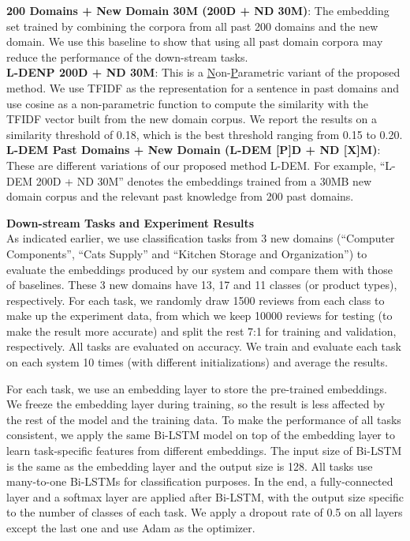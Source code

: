 \textbf{200 Domains + New Domain 30M (200D + ND 30M)}: The embedding set trained by combining the corpora from all past 200 domains and the new domain. We use this baseline to show that using all past domain corpora may reduce the performance of the down-stream tasks. \\
\textbf{L-DENP 200D + ND 30M}: This is a \underline{N}on-\underline{P}arametric variant of the proposed method. We use TFIDF as the representation for a sentence in past domains and use cosine as a non-parametric function to compute the similarity with the TFIDF vector built from the new domain corpus. 
We report the results on a similarity threshold of 0.18, which is the best threshold ranging from 0.15 to 0.20.\\
\textbf{L-DEM Past Domains + New Domain (L-DEM [P]D + ND [X]M)}: These are different variations of our proposed method L-DEM. For example, ``L-DEM 200D + ND 30M'' denotes the embeddings trained from a 30MB new domain corpus and the relevant past knowledge from 200 past domains.

\textbf{Down-stream Tasks and Experiment Results}\\
As indicated earlier, we use classification tasks from 3 new domains (``Computer Components'', ``Cats Supply'' and ``Kitchen Storage and Organization'') to evaluate the embeddings produced by our system and compare them with those of baselines. 
These 3 new domains have 13, 17 and 11 classes (or product types), respectively.
For each task, we randomly draw 1500 reviews from each class to make up the experiment data, from which we keep 10000 reviews for testing (to make the result more accurate) and split the rest 7:1 for training and validation, respectively.
All tasks are evaluated on accuracy.
We train and evaluate each task on each system 10 times (with different initializations) and average the results.

For each task, we use an embedding layer to store the pre-trained embeddings.
We freeze the embedding layer during training, so the result is less affected by the rest of the model and the training data.
To make the performance of all tasks consistent, 
we apply the same Bi-LSTM model \cite{hochreiter1997long} on top of the embedding layer to learn task-specific features from different embeddings.
The input size of Bi-LSTM is the same as the embedding layer and the output size is 128.
All tasks use many-to-one Bi-LSTMs for classification purposes.
In the end, a fully-connected layer and a softmax layer are applied after Bi-LSTM, with the output size specific to the number of classes of each task.
We apply a dropout rate of 0.5 on all layers except the last one and use Adam \cite{kingma2014adam} as the optimizer.

